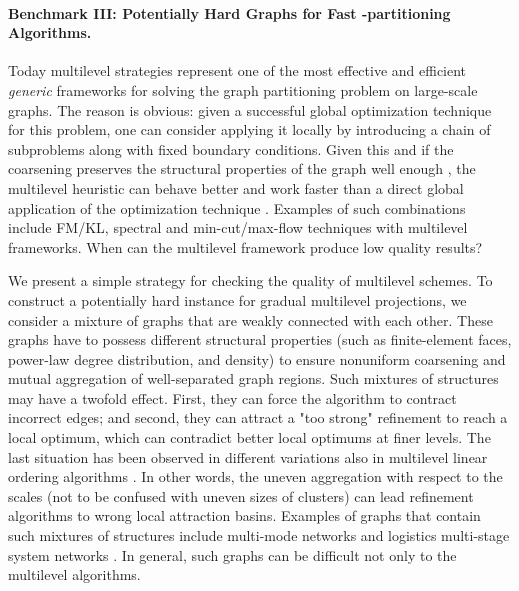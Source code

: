 \documentclass{llncs}
\begin{document}
\paragraph{Benchmark III: Potentially Hard Graphs for Fast -partitioning Algorithms.}  Today multilevel strategies represent one of the most effective and efficient \emph{generic} frameworks for solving the graph partitioning problem on large-scale graphs. 
The reason is obvious: given a successful global optimization technique  for this problem, one can consider applying it locally by introducing a chain of subproblems along with fixed boundary conditions. 
 Given this and if the coarsening preserves the structural properties of the graph well enough 
, the multilevel heuristic can behave better and work faster
than a direct global application of the optimization technique . 
Examples of such combinations include FM/KL, spectral and min-cut/max-flow techniques with multilevel frameworks. When can the multilevel framework produce low quality results?
\par We present a simple strategy for checking the quality of multilevel schemes. 
To construct a potentially hard instance for gradual multilevel projections, we consider a mixture of graphs that are weakly connected with each other. 
These graphs have to possess different structural properties (such as finite-element faces, power-law degree distribution, and density) to ensure nonuniform coarsening and mutual aggregation of well-separated graph regions. Such mixtures of structures may have a twofold effect. First, they can force the algorithm to contract incorrect edges; and second, they can attract a "too strong" refinement to reach a local optimum, which can contradict better local optimums at finer levels. The last situation has been observed in different variations also in multilevel linear ordering algorithms \cite{safro2005}.
In other words, the uneven aggregation with respect to the scales (not to be confused with uneven sizes of clusters) can lead refinement algorithms to wrong local attraction basins. Examples of graphs that contain such mixtures of structures include multi-mode networks \cite{multimode} and logistics multi-stage system networks \cite{stock2006strategic}. In general, such graphs can be difficult not only to the multilevel algorithms.
\end{document}
